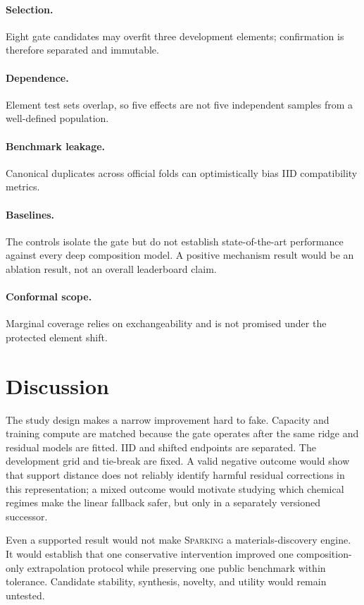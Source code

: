 \documentclass[11pt]{article}
\newcommand{\method}{\textsc{Sparking}}
\begin{document}
\paragraph{Selection.} Eight gate candidates may overfit three development
elements; confirmation is therefore separated and immutable.
\paragraph{Dependence.} Element test sets overlap, so five effects are not five
independent samples from a well-defined population.
\paragraph{Benchmark leakage.} Canonical duplicates across official folds can
optimistically bias IID compatibility metrics.
\paragraph{Baselines.} The controls isolate the gate but do not establish
state-of-the-art performance against every deep composition model. A positive
mechanism result would be an ablation result, not an overall leaderboard claim.
\paragraph{Conformal scope.} Marginal coverage relies on exchangeability and is
not promised under the protected element shift.

\section{Discussion}
The study design makes a narrow improvement hard to fake. Capacity and training
compute are matched because the gate operates after the same ridge and residual
models are fitted. IID and shifted endpoints are separated. The development
grid and tie-break are fixed. A valid negative outcome would show that support
distance does not reliably identify harmful residual corrections in this
representation; a mixed outcome would motivate studying which chemical regimes
make the linear fallback safer, but only in a separately versioned successor.

Even a supported result would not make \method{} a materials-discovery engine.
It would establish that one conservative intervention improved one
composition-only extrapolation protocol while preserving one public benchmark
within tolerance. Candidate stability, synthesis, novelty, and utility would
remain untested.
\end{document}
